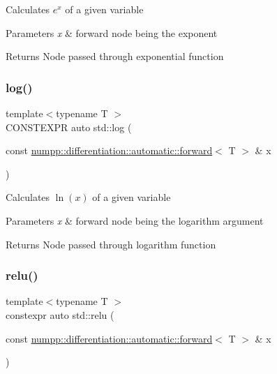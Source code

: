 Calculates $e^x$ of a given variable 
\begin{DoxyParams}{Parameters}
{\em x} & forward node being the exponent \\
\hline
\end{DoxyParams}
\begin{DoxyReturn}{Returns}
Node passed through exponential function
\end{DoxyReturn}
\mbox{\label{group__numpp__differentiation__forward__automatic_ga0f6011595edffe756a984de60358fe5f}} 
\subsubsection{\texorpdfstring{log()}{log()}}
{\footnotesize\ttfamily template$<$typename T $>$ \\
C\+O\+N\+S\+T\+E\+X\+PR auto std\+::log (\begin{DoxyParamCaption}\item[{const \hyperlink{classnumpp_1_1differentiation_1_1automatic_1_1forward}{numpp\+::differentiation\+::automatic\+::forward}$<$ T $>$ \&}]{x }\end{DoxyParamCaption})}

Calculates $\ln(x)$ of a given variable 
\begin{DoxyParams}{Parameters}
{\em x} & forward node being the logarithm argument \\
\hline
\end{DoxyParams}
\begin{DoxyReturn}{Returns}
Node passed through logarithm function
\end{DoxyReturn}
\mbox{\label{group__numpp__differentiation__forward__automatic_ga2faff4e6f917370493a6c12f947e2573}} 
\subsubsection{\texorpdfstring{relu()}{relu()}}
{\footnotesize\ttfamily template$<$typename T $>$ \\
constexpr auto std\+::relu (\begin{DoxyParamCaption}\item[{const \hyperlink{classnumpp_1_1differentiation_1_1automatic_1_1forward}{numpp\+::differentiation\+::automatic\+::forward}$<$ T $>$ \&}]{x }\end{DoxyParamCaption})}

